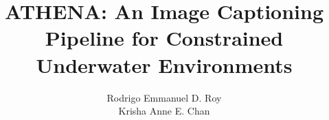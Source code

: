 \documentclass[letterpaper,12pt]{report}
\newlength{\defbaselineskip}
\newcommand{\setlinespacing}[1]
           {\setlength{\baselineskip}{#1 \defbaselineskip}}
\theoremstyle{plain}
\theoremstyle{definition}
\theoremstyle{remark}
\numberwithin{equation}{section}
\begin{document}

\permissionfalse



\title{ATHENA: An Image Captioning Pipeline for Constrained Underwater Environments}


\author{Rodrigo Emmanuel D. Roy \\
        Krisha Anne E. Chan
}

\newcommand\authorline{Rodrigo Emmanuel D. Roy and Krisha Anne E. Chan}


{
\beforepreface
{} %
}
{

}
{

}
\afterpreface
\def\baselinestretch{1}
\setlinespacing{1.66}
{
%
}
\setlinespacing{1.66}







\appendix



\setlinespacing{1.44}
% 


\end{document}
